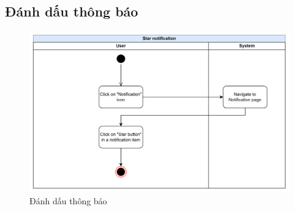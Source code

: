 \subsection{Đánh dấu thông báo}
\begin{figure}[H]
    \centering
    \includegraphics[width=\linewidth]{Content/Phân tích và thiết kế hệ thống/documents/Sơ đồ hoạt động/images/starNotification.png}
    \vspace{0.5cm}
    \caption{Đánh dấu thông báo}
    \label{fig:Đánh dấu thông báo}
\end{figure}
